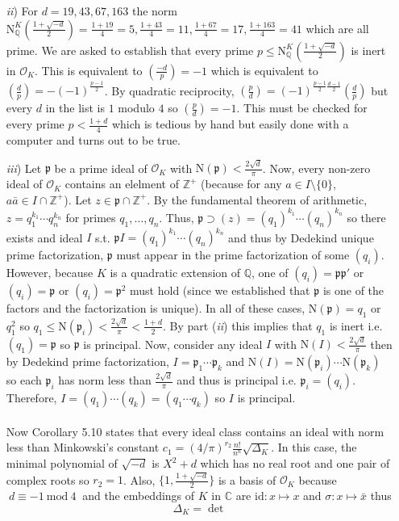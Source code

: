 \documentclass[12pt]{extarticle}
\newcommand{\C}{\mathbb{C}}
\newcommand{\Zplus}{\mathbb{Z}^{+}}
\newcommand{\Q}{\mathbb{Q}}
\newcommand{\legsym}[2]{\left(\frac{#1}{#2} \right)}
\renewcommand{\mod}[3]{\: #1 \equiv #2 \: \mathrm{mod} \: #3 \:}
\newcommand{\ints}[1]{\mathcal{O}_{#1}}
\newcommand{\sm}{\! \setminus \!}
\newcommand{\qnorm}[2]{\mathrm{N}^{#1}_{\Q}\left(#2\right)}
\newcommand{\pideal}{\mathfrak{p}}
\begin{document}
\begin{enumerate}
\begin{enumerate}
\item[\textit{ii})] For $d = 19, 43, 67, 163$ the norm $\qnorm{K}{\frac{1 + \sqrt{-d}}{2}} = \frac{1+19}{4} = 5, \frac{1+43}{4} = 11, \frac{1 + 67}{4} = 17, \frac{1 + 163}{4} = 41$ which are all prime. We are asked to establish that every prime $p \le \qnorm{K}{\frac{1 + \sqrt{-d}}{2}}$ is inert in $\ints{K}$. This is equivalent to $\legsym{-d}{p} = -1$ which is equivalent to $\legsym{d}{p} = -(-1)^{\frac{p-1}{2}}$. By quadratic reciprocity, $\legsym{p}{d} = (-1)^{\frac{p-1}{2} \frac{d-1}{2}} \legsym{d}{p} $ but every $d$ in the list is $1$ modulo $4$ so $\legsym{p}{d} = -1$. This must be checked for every prime $p < \frac{1+d}{4}$ which is tedious by hand but easily done with a computer and turns out to be true.   

\item[\textit{iii})] Let $\pideal$ be a prime ideal of $\ints{K}$ with $\mathrm{N}(\pideal) < \frac{2 \sqrt{d}}{\pi}$. Now, every non-zero ideal of $\ints{K}$ contains an elelment of $\Zplus$ (because for any $a \in I \sm \{0\}$, $a \bar{a} \in I \cap \Zplus$). Let $z \in \pideal \cap \Zplus$. By the fundamental theorem of arithmetic, $z = q_1^{k_1} \cdots q_n^{k_n}$ for primes $q_1, \dots, q_n$. Thus, $\pideal \supset (z) = (q_1)^{k_1} \cdots (q_n)^{k_n}$ so there exists and ideal $I$ s.t. $\pideal I = (q_1)^{k_1} \cdots (q_n)^{k_n}$ and thus by Dedekind unique prime factorization, $\pideal$ must appear in the prime factorization of some $(q_i)$. However, because $K$ is a quadratic extension of $\Q$, one of $(q_i) = \pideal \pideal'$ or $(q_i) = \pideal$ or $(q_i) = \pideal^2$ must hold (since we established that $\pideal$ is one of the factors and the factorization is unique). In all of these cases, $\mathrm{N}(\pideal) = q_1$ or $q_1^2$ so $q_1 \le \mathrm{N}(\pideal_i) < \frac{2 \sqrt{d}}{\pi} < \frac{1 + d}{2}$. By part (\textit{ii}) this implies that $q_1$ is inert i.e. $(q_1) = \pideal$ so $\pideal$ is principal. Now, consider any ideal $I$ with $\mathrm{N}(I) < \frac{2 \sqrt{d}}{\pi}$ then by Dedekind prime factorization, $I = \pideal_1  \cdots \pideal_k$ and $\mathrm{N}(I) = \mathrm{N}(\pideal_i) \cdots \mathrm{N} (\pideal_k)$ so each $\pideal_i$ has norm less than $\frac{2 \sqrt{d}}{\pi}$ and thus is principal i.e. $\pideal_i = (q_i)$. Therefore, $I = (q_1) \cdots (q_k) = (q_1 \cdots q_k)$ so $I$ is principal. \\ \\
Now Corollary 5.10 states that every ideal class contains an ideal with norm less than Minkowski’s constant $c_1 = (4/\pi)^{r_2} \frac{n!}{n^n} \sqrt{\Delta_K}$. In this case, the minimal polynomial of $\sqrt{-d}$ is $X^2 + d$ which has no real root and one pair of complex roots so $r_2 = 1$. Also, $\{1, \frac{1 + \sqrt{-d}}{2}\}$ is a basis of $\ints{K}$ because $\mod{d}{-1}{4}$ and the embeddings of $K$ in $\C$ are $\mathrm{id} : x \mapsto x$ and $\sigma : x \mapsto \bar{x}$ thus \[ \Delta_K = \det{
}\]
\end{enumerate}
\end{enumerate}
\end{document}
